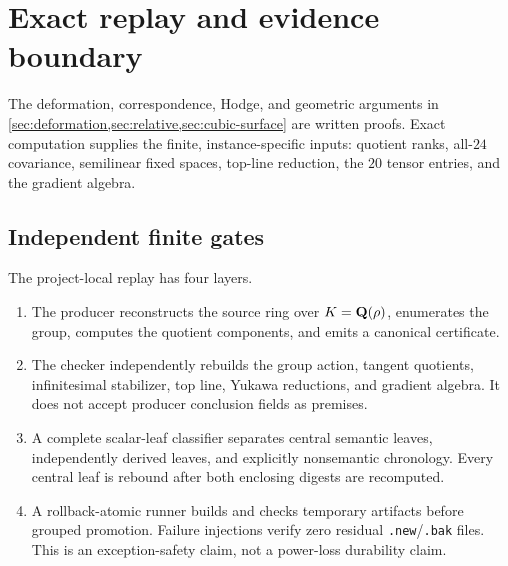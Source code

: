 \section{Exact replay and evidence boundary}
\label{sec:exact-replay}

The deformation, correspondence, Hodge, and geometric arguments in
\cref{sec:deformation,sec:relative,sec:cubic-surface} are written proofs.
Exact computation supplies the finite, instance-specific inputs: quotient
ranks, all-\(24\) covariance, semilinear fixed spaces, top-line reduction,
the \(20\) tensor entries, and the gradient algebra.

\subsection{Independent finite gates}

The project-local replay has four layers.
\begin{enumerate}[leftmargin=*]
\item The producer reconstructs the source ring over \(K=\mathbf Q(\rho)\),
enumerates the group, computes the quotient components, and emits a
canonical certificate.
\item The checker independently rebuilds the group action, tangent
quotients, infinitesimal stabilizer, top line, Yukawa reductions, and
gradient algebra.  It does not accept producer conclusion fields as
premises.
\item A complete scalar-leaf classifier separates central semantic leaves,
independently derived leaves, and explicitly nonsemantic chronology.  Every
central leaf is rebound after both enclosing digests are recomputed.
\item A rollback-atomic runner builds and checks temporary artifacts before
grouped promotion.  Failure injections verify zero residual
\texttt{.new}/\texttt{.bak} files.  This is an exception-safety claim, not a
power-loss durability claim.
\end{enumerate}

